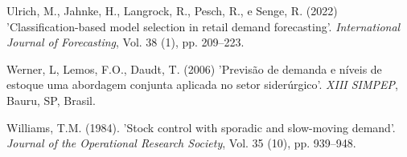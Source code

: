 \documentclass[11pt,letterpaper,twocolumn]{article}
\begin{document}
\begin{thebibliography}{9}
Ulrich, M., Jahnke, H., Langrock, R., Pesch, R., e Senge, R. (2022) 'Classification-based model selection in retail demand forecasting'. {\it International Journal of Forecasting}, Vol. 38 (1), pp. 209--223.

Werner, L, Lemos, F.O., Daudt, T. (2006) 'Previsão de demanda e níveis de estoque uma abordagem conjunta aplicada no setor siderúrgico'. {\it XIII SIMPEP}, Bauru, SP, Brasil.

Williams, T.M. (1984). 'Stock control with sporadic and slow-moving demand'. {\it Journal of the Operational Research Society}, Vol. 35 (10), pp. 939–948. 

\end{thebibliography} 
\end{document}
